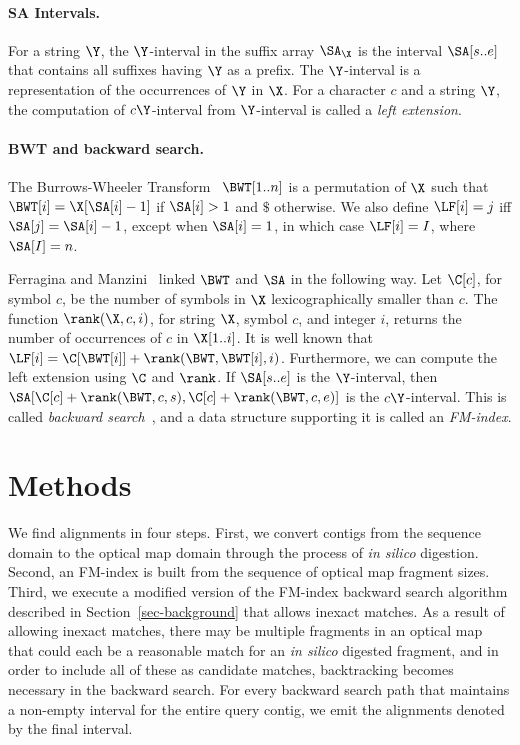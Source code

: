 \documentclass[doctor]{thesis}
\begin{document}
\paragraph{SA Intervals.} 
For a string $\Y$, the $\Y$-interval in the suffix array $\SA_{\X}$ is
the interval $\SA[s..e]$ that contains all suffixes having $\Y$ as a
prefix. The $\Y$-interval is a representation of the occurrences of
$\Y$ in $\X$. For a character $c$ and a string $\Y$, the computation
of $c\Y$-interval from $\Y$-interval is called a \emph{left extension}.

\paragraph{BWT and backward search.}
The Burrows-Wheeler Transform~\cite{bw1994} $\BWT[1..n]$ is a
permutation of $\X$ such that $\BWT[i] = \X[\SA[i]-1]$ if $\SA[i]>1$
and $\$$ otherwise. We also define $\LF[i] = j$ iff $\SA[j] =
\SA[i]-1$, except when $\SA[i] = 1$, in which case $\LF[i] = I$,
where $\SA[I] = n$.

Ferragina and Manzini~\cite{fm2005} linked $\BWT$ and $\SA$ in the
following way.  
Let $\C[c]$, for symbol $c$, be the number of symbols
in $\X$ lexicographically smaller than $c$.  The function
$\rank(\X,c,i)$, for string $\X$, symbol $c$, and integer $i$, returns
the number of occurrences of $c$ in $\X[1..i]$.  It is well known that
$\LF[i] = \C[\BWT[i]] + \rank(\BWT,\BWT[i],i)$.  Furthermore, we can
compute the left extension using $\C$ and $\rank$.  If $\SA[s..e]$ is
the $\Y$-interval,
then
$\SA[\C[c]+\rank(\BWT,c,s),\C[c]+\rank(\BWT,c,e)]$ is
the $c\Y$-interval.
This is called \emph{backward search}~\cite{fm2005}, and a data
structure supporting it is called an {\em FM-index}.

 
\makeatletter{}
\section{Methods}
\label{sec-methods}



We find alignments in four steps.  First, we convert contigs from the sequence domain to the optical map domain through the process of {\em in silico} digestion. Second, an FM-index is built from the sequence of optical map fragment sizes. Third, we execute a modified version of the FM-index backward search algorithm described in Section~\ref{sec-background} that allows inexact matches.
As a result of allowing inexact matches, there may be multiple fragments in an optical map that could each be a reasonable match for an {\em in silico} digested fragment, and in order to include all of these as candidate matches, backtracking becomes necessary in the backward search.
For every backward search path that maintains a non-empty interval for the entire query contig, we emit the alignments denoted by the final interval.
\end{document}

